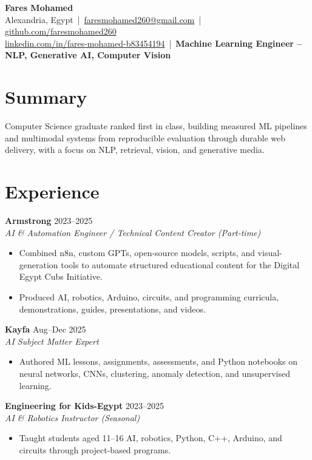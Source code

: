 \documentclass[letterpaper]{article}
\newcommand{\roleline}[3]{\textbf{#1} \hfill #2 \\\textit{#3} \\}
\begin{document}
\footnotesize
\begin{center}
{\LARGE \textbf{Fares Mohamed}}\\[3pt]
Alexandria, Egypt \,|\, \href{mailto:faresmohamed260@gmail.com}{faresmohamed260@gmail.com} \,|\, \href{https://github.com/faresmohamed260}{github.com/faresmohamed260}\\
\href{https://www.linkedin.com/in/fares-mohamed-b83454194/}{linkedin.com/in/fares-mohamed-b83454194} \,|\, \textbf{Machine Learning Engineer -- NLP, Generative AI, Computer Vision}
\end{center}

\section*{Summary}
Computer Science graduate ranked first in class, building measured ML pipelines and multimodal systems from reproducible evaluation through durable web delivery, with a focus on NLP, retrieval, vision, and generative media.

\section*{Experience}
\roleline{Armstrong}{2023--2025}{AI \& Automation Engineer / Technical Content Creator (Part-time)}
\begin{itemize}
\item Combined n8n, custom GPTs, open-source models, scripts, and visual-generation tools to automate structured educational content for the Digital Egypt Cubs Initiative.
\item Produced AI, robotics, Arduino, circuits, and programming curricula, demonstrations, guides, presentations, and videos.
\end{itemize}
\roleline{Kayfa}{Aug--Dec 2025}{AI Subject Matter Expert}
\begin{itemize}
\item Authored ML lessons, assignments, assessments, and Python notebooks on neural networks, CNNs, clustering, anomaly detection, and unsupervised learning.
\end{itemize}
\roleline{Engineering for Kids-Egypt}{2023--2025}{AI \& Robotics Instructor (Seasonal)}
\begin{itemize}
\item Taught students aged 11--16 AI, robotics, Python, C++, Arduino, and circuits through project-based programs.
\end{itemize}
\end{document}
